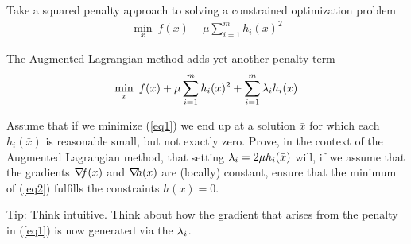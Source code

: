 

\renewcommand{\course}{Optimization}
\renewcommand{\coursepicture}{optim}
\renewcommand{\coursedate}{Summer 2015}
\renewcommand{\exnum}{5}

\exercises
{}
\exercisestitle



Take a squared penalty approach to solving a constrained optimization problem
\begin{align}
\min_x~ f(x) + \mu \sum_{i=1}^m h_i(x)^2 \label{eq1}
\end{align}

The Augmented Lagrangian method adds yet another penalty term
\begin{align}
\min_x~ f(x) + \mu \sum_{i=1}^m h_i(x)^2 + \sum_{i=1}^m \lambda_i h_i(x)\label{eq2}
\end{align}

Assume that if we minimize (\ref{eq1}) we end up at a solution $\bar{x}$ for
which each $h_i(\bar{x})$ is reasonable small, but not exactly zero.  Prove, in
the context of the Augmented Lagrangian method, that setting $\lambda_i = 2\mu
h_i(\bar{x})$ will, if we assume that the gradients ${\nabla_{\!\!}} f(x)$ and ${\nabla_{\!\!}} h(x)$
are (locally) constant, ensure that the minimum of (\ref{eq2}) fulfills
the constraints $h(x)=0$.

Tip: Think intuitive. Think about how the gradient that arises from
the penalty in (\ref{eq1}) is now generated via the $\lambda_i$.






